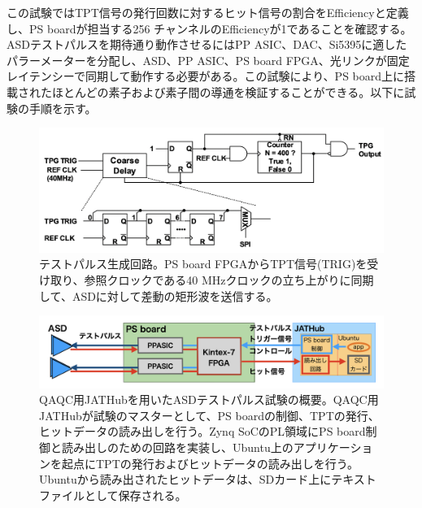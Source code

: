 この試験ではTPT信号の発行回数に対するヒット信号の割合をEfficiencyと定義し、PS boardが担当する256 チャンネルのEfficiencyが1であることを確認する。
ASDテストパルスを期待通り動作させるにはPP ASIC、DAC、Si5395に適したパラーメーターを分配し、ASD、PP ASIC、PS board FPGA、光リンクが固定レイテンシーで同期して動作する必要がある。この試験により、PS board上に搭載されたほとんどの素子および素子間の導通を検証することができる。以下に試験の手順を示す。


\begin{figure} 
    \centering
    \includegraphics[width=16cm]{fig/QAQC/PSBtpg.png}
    \caption[テストパルス生成回路]{テストパルス生成回路。PS board FPGAからTPT信号(TRIG)を受け取り、参照クロックである40 MHzクロックの立ち上がりに同期して、ASDに対して差動の矩形波を送信する。}
    \label{PSBtpg}
\end{figure}

\begin{figure} 
\centering
\includegraphics[width=16cm]{fig/QAQC/QAQCasdtp.png}
\caption[QAQC用JATHubを用いたASDテストパルス試験]{QAQC用JATHubを用いたASDテストパルス試験の概要。QAQC用JATHubが試験のマスターとして、PS boardの制御、TPTの発行、ヒットデータの読み出しを行う。Zynq SoCのPL領域にPS board制御と読み出しのための回路を実装し、Ubuntu上のアプリケーションを起点にTPTの発行およびヒットデータの読み出しを行う。Ubuntuから読み出されたヒットデータは、SDカード上にテキストファイルとして保存される。}
\label{QAQCasdtp}
\end{figure}

